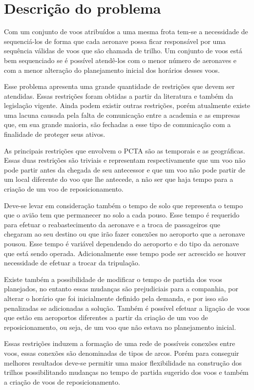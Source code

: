\chapter{Descrição do problema}\label{cap:descprob}

Com um conjunto de voos atribuídos a uma mesma frota tem-se a necessidade de
sequenciá-los de forma que cada aeronave possa ficar responsável por uma
sequência válidas de voos que são chamada de trilho. Um conjunto de voos está
bem sequenciado se é possível atendê-los com o menor número de aeronaves e com a
menor alteração do planejamento inicial dos horários desses voos.
 
Esse problema apresenta uma grande quantidade de restrições que devem ser
atendidas. Essas restrições foram obtidas a partir da literatura e também da
legislação vigente. Ainda podem existir outras restrições, porém
atualmente existe uma lacuna causada pela falta de comunicação entre a
academia e as empresas que, em sua grande maioria, são fechadas a esse tipo de
comunicação com a finalidade de proteger seus ativos.

As principais restrições que envolvem o PCTA são as temporais e as geográficas.
Essas duas restrições são triviais e representam respectivamente que um voo não
pode partir antes da chegada de seu antecessor e que um voo não pode partir de
um local diferente do voo que lhe antecede, a não ser que haja tempo para a
criação de um voo de reposicionamento. 

Deve-se levar em consideração também o
tempo de solo que representa o tempo que o avião tem que permanecer no solo a
cada pouso. Esse tempo é requerido para efetuar o reabastecimento da aeronave e a
troca de passageiros que chegaram ao seu destino ou que irão fazer conexões no
aeroporto que a aeronave pousou. Esse tempo é variável dependendo do
aeroporto e do tipo da aeronave que está sendo operada. Adicionalmente esse
tempo pode ser acrescido se houver necessidade de efetuar a trocar da
tripulação.

Existe também a possibilidade de modificar o tempo de partida dos voos
planejados, no entanto essas mudanças são prejudiciais para a companhia, por
alterar o horário que foi inicialmente definido pela demanda, e por isso são
penalizadas se adicionadas a solução. Também é possível efetuar a ligação de
voos que estão em aeroportos diferentes a partir da criação de um voo de
reposicionamento, ou seja, de um voo que não estava no planejamento
inicial.

Essas restrições induzem a formação de uma rede de possíveis conexões entre
voos, essas conexões são denominadas de tipos de arcos. Porém para conseguir
melhores resultados deve-se permitir uma maior flexibilidade na construção dos
trilhos possibilitando mudanças no tempo de partida sugerido dos voos e
também a criação de voos de reposicionamento.

